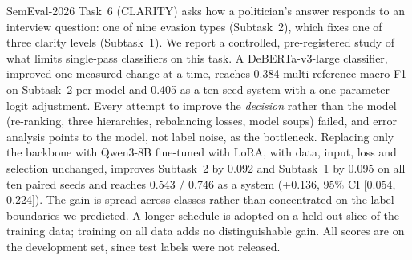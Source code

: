 SemEval-2026 Task~6 (CLARITY) asks how a politician's answer responds to an interview question: one of nine evasion types (Subtask~2), which fixes one of three clarity levels (Subtask~1).
We report a controlled, pre-registered study of what limits single-pass classifiers on this task.
A DeBERTa-v3-large classifier, improved one measured change at a time, reaches 0.384 multi-reference macro-F1 on Subtask~2 per model and 0.405 as a ten-seed system with a one-parameter logit adjustment.
Every attempt to improve the \emph{decision} rather than the model (re-ranking, three hierarchies, rebalancing losses, model soups) failed, and error analysis points to the model, not label noise, as the bottleneck.
Replacing only the backbone with Qwen3-8B fine-tuned with LoRA, with data, input, loss and selection unchanged, improves Subtask~2 by 0.092 and Subtask~1 by 0.095 on all ten paired seeds and reaches 0.543 / 0.746 as a system (+0.136, 95\% CI [0.054, 0.224]).
The gain is spread across classes rather than concentrated on the label boundaries we predicted.
A longer schedule is adopted on a held-out slice of the training data; training on all data adds no distinguishable gain.
All scores are on the development set, since test labels were not released.

